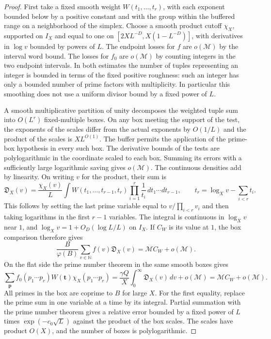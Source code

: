 \documentclass[11pt,a4paper]{article}
\theoremstyle{paperplain}
\numberwithin{equation}{section}
\begin{document}
\begin{proof}
First take a fixed smooth weight \(W(t_1,\ldots,t_r)\), with each
exponent bounded below by a positive constant and with the group
within the buffered range on a neighborhood of the simplex.
Choose a smooth product cutoff \(\chi_X\), supported on \(I_X\)
and equal to one on
\([2XL^{-D},X(1-L^{-D})]\), with derivatives in \(\log v\)
bounded by powers of \(L\). The endpoint losses for \(f\) are
\(o(\mathcal M)\) by the interval word bound. The losses for \(f_0\)
are \(o(\mathcal M)\) by counting integers in the two endpoint
intervals. In both estimates the number of tuples representing
an integer is bounded in terms of the fixed positive roughness:
such an integer has only a bounded number of prime factors with
multiplicity. In particular this smoothing does not use a
uniform divisor bound by a fixed power of \(L\).

A smooth multiplicative partition of unity decomposes the
weighted tuple sum into \(O(L^r)\) fixed-multiple boxes. On any
box meeting the support of the test, the exponents of the
scales differ from the actual exponents by \(O(1/L)\) and
the product of the scales is \(X L^{O(1)}\). The buffer
permits the application of the prime-box hypothesis in every
such box. The derivative bounds of the tests are polylogarithmic
in the coordinate scaled to each box. Summing its errors with a
sufficiently large logarithmic saving gives \(o(\mathcal M)\).
The continuous densities add by linearity. On writing \(v\) for
the product, their sum is
\[
 \mathfrak D_X(v)=\frac{\chi_X(v)}{L}
      \int W(t_1,\ldots,t_{r-1},t_r)
          \prod_{i=1}^r\frac1{t_i}\,dt_1\cdots dt_{r-1},
 \qquad t_r=\log_Xv-\sum_{i<r}t_i .
\]
This follows by setting the last prime variable equal to
\(v/\prod_{i<r}v_i\) and then taking logarithms in the first
\(r-1\) variables. The integral is continuous in \(\log_X v\)
near \(1\), and \(\log_X v=1+O_D(\log L/L)\) on \(I_X\). If
\(C_W\) is its value at \(1\), the box comparison therefore gives
\[
 \frac{B}{\varphi(B)}\sum_{v\in\mathbb N} f(v)\mathfrak D_X(v)
       =\mathcal M C_W+o(\mathcal M).
\]
On the flat side the prime number theorem in the same smooth
boxes gives
\[
 \sum_{\boldsymbol p}f_0(p_1\cdots p_r)
      W(\boldsymbol t)\chi_X(p_1\cdots p_r)
       = \frac{\gamma Q}{X}\int_0^\infty\mathfrak D_X(v)\,dv
           +o(\mathcal M)
       =\mathcal M C_W+o(\mathcal M).
\]
All primes in the box are coprime to $B$ for large \(X\).
For the first equality, replace the prime sum in one variable
at a time by its integral. Partial summation with the prime
number theorem gives a relative error bounded by a fixed power
of \(L\) times \(\exp(-c_0\sqrt L)\) against the product of the
box scales. The scales have product \(O(X)\), and the number
of boxes is polylogarithmic.


\end{proof}
\end{document}

